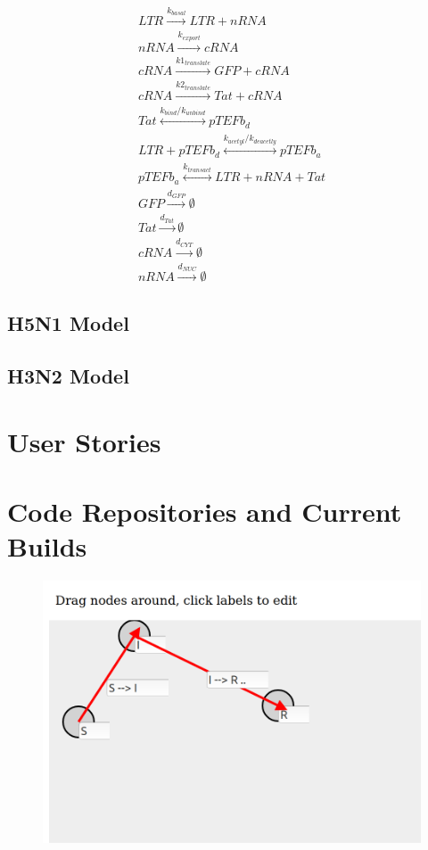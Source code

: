 \documentclass[11pt]{article}
\begin{document}
\begin{eqnarray}
LTR \overset{k_{basal}}{\rightarrow} LTR + nRNA\\
nRNA \overset{k_{export}}{\rightarrow} cRNA\\
  cRNA \overset{k1_{translate}}{\rightarrow} GFP + cRNA\\
  cRNA \overset{k2_{translate}}{\rightarrow} Tat + cRNA\\
  Tat \overset{k_{bind}/k_{unbind}}{\leftrightarrow} pTEFb_d\\
  LTR + pTEFb_d \overset{k_{acetyl}/k_{deacetly}}{\leftrightarrow} pTEFb_a\\
  pTEFb_a \overset{k_{transact}}{\leftrightarrow} LTR + nRNA + Tat\\
  GFP \overset{d_{GFP}}{\rightarrow} \emptyset\\
  Tat \overset{d_{Tat}}{\rightarrow} \emptyset\\
  cRNA \overset{d_{CYT}}{\rightarrow} \emptyset\\
  nRNA \overset{d_{NUC}}{\rightarrow} \emptyset
\end{eqnarray}

\subsection{H5N1 Model}

\subsection{H3N2 Model}

\section{User Stories}

\section{Code Repositories and Current Builds}

\begin{figure}
\includegraphics[width=\textwidth]{figs/Editor.png}
\caption{}
\label{Fig:Editor}
\end{figure}
\end{document}
